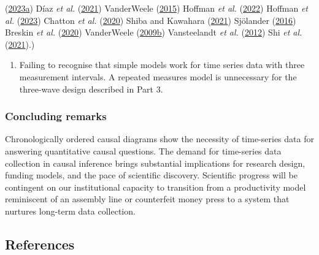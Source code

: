 \documentclass[
  singlecolumn]{article}
\providecommand{\tightlist}{%
  \setlength{\itemsep}{0pt}\setlength{\parskip}{0pt}}\usepackage{longtable,booktabs,array}
\begin{document}
\begin{enumerate}
{    (\protect\hyperlink{ref-hernuxe1n2023}{2023a}) Díaz \emph{et al.}
    (\protect\hyperlink{ref-duxedaz2021}{2021}) VanderWeele
    (\protect\hyperlink{ref-vanderweele2015}{2015}) Hoffman \emph{et
    al.} (\protect\hyperlink{ref-hoffman2022}{2022}) Hoffman \emph{et
    al.} (\protect\hyperlink{ref-hoffman2023}{2023}) Chatton \emph{et
    al.} (\protect\hyperlink{ref-chatton2020}{2020}) Shiba and Kawahara
    (\protect\hyperlink{ref-shiba2021}{2021}) Sjölander
    (\protect\hyperlink{ref-sjuxf6lander2016}{2016}) Breskin \emph{et
    al.} (\protect\hyperlink{ref-breskin2020}{2020}) VanderWeele
    (\protect\hyperlink{ref-vanderweele2009a}{2009b}) Vansteelandt
    \emph{et al.} (\protect\hyperlink{ref-vansteelandt2012}{2012}) Shi
    \emph{et al.} (\protect\hyperlink{ref-shi2021}{2021}).)}
\end{enumerate}

\begin{enumerate}
\def\labelenumi{\arabic{enumi}.}
\setcounter{enumi}{11}
\tightlist
\item
  Failing to recognise that simple models work for time series data with
  three measurement intervals. A repeated measures model is unnecessary
  for the three-wave design described in Part 3.
\end{enumerate}

\hypertarget{concluding-remarks}{%
\subsubsection{Concluding remarks}\label{concluding-remarks}}

Chronologically ordered causal diagrams show the necessity of
time-series data for answering quantitative causal questions. The demand
for time-series data collection in causal inference brings substantial
implications for research design, funding models, and the pace of
scientific discovery. Scientific progress will be contingent on our
institutional capacity to transition from a productivity model
reminiscent of an assembly line or counterfeit money press to a system
that nurtures long-term data collection.

\newpage{}

\hypertarget{references}{%
\subsection{References}\label{references}}
\end{document}

